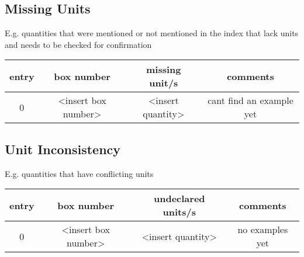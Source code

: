 \subsection{Missing Units}

E.g. quantities that were mentioned or not mentioned in the index that lack units and needs to be checked for confirmation \\

\begin{tabular} { | c | c | c | c | } 
 \hline
 	entry & box number
    & missing unit/s 
    & comments\\
     \hline
	0 & <insert box number> & <insert quantity> & cant find an example yet \\ \hline
\hline

\end{tabular}

\subsection{Unit Inconsistency}

E.g. quantities that have conflicting units \\ 

\begin{tabular} { | c | c | c | c | } 
 \hline
    entry & box number
    & undeclared units/s 
    & comments \\
 \hline
	0 & <insert box number> & <insert quantity> & no examples yet \\ \hline


\end{tabular}